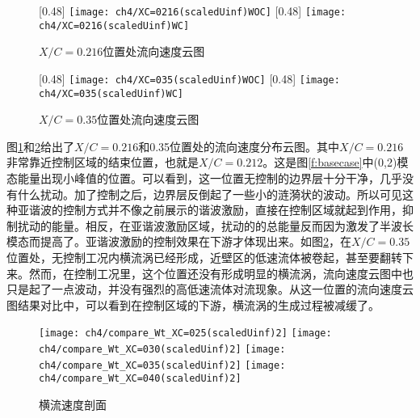 \begin{figure}[htb]
\centering
{}[0.48\linewidth]{           %
\texttt{[image: ch4/XC=0216(scaledUinf)WOC]}}
[0.48\linewidth]{
\texttt{[image: ch4/XC=0216(scaledUinf)WC]}}
\caption{$X/C=0.216$位置处流向速度云图}
\label{fig:ContU0216} %
\end{figure}
\begin{figure}[htb]
\centering
{}[0.48\linewidth]{           %
\texttt{[image: ch4/XC=035(scaledUinf)WOC]}}
[0.48\linewidth]{
\texttt{[image: ch4/XC=035(scaledUinf)WC]}}
\caption{$X/C=0.35$位置处流向速度云图}
\label{fig:ContU0350} %
\end{figure}
图\ref{fig:ContU0216}和\ref{fig:ContU0350}给出了$X/C=0.216$和0.35位置处的流向速度分布云图。其中$X/C=0.216$非常靠近控制区域的结束位置，也就是$X/C=0.212$。这是图\ref{f:basecase}中(0,2)模态能量出现小峰值的位置。可以看到，这一位置无控制的边界层十分干净，几乎没有什么扰动。加了控制之后，边界层反倒起了一些小的涟漪状的波动。所以可见这种亚谐波的控制方式并不像之前展示的谐波激励，直接在控制区域就起到作用，抑制扰动的能量。相反，在亚谐波激励区域，扰动的的总能量反而因为激发了半波长模态而提高了。亚谐波激励的控制效果在下游才体现出来。如图\ref{fig:ContU0350}，在$X/C=0.35$位置处，无控制工况内横流涡已经形成，近壁区的低速流体被卷起，甚至要翻转下来。然而，在控制工况里，这个位置还没有形成明显的横流涡，流向速度云图中也只是起了一点波动，并没有强烈的高低速流体对流现象。从这一位置的流向速度云图结果对比中，可以看到在控制区域的下游，横流涡的生成过程被减缓了。
\begin{figure}
\centering
\texttt{[image: ch4/compare\_Wt\_XC=025(scaledUinf)2]}
\texttt{[image: ch4/compare\_Wt\_XC=030(scaledUinf)2]}
\texttt{[image: ch4/compare\_Wt\_XC=035(scaledUinf)2]}
\texttt{[image: ch4/compare\_Wt\_XC=040(scaledUinf)2]}
\caption{横流速度剖面}%
\label{f:CFprofiles}
\end{figure}


